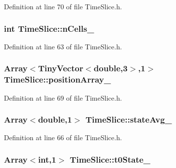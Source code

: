 \-Definition at line 70 of file \-Time\-Slice.\-h.

\hypertarget{class_time_slice_a8c39fe1d753d9af20ea7792cf727ca95}{
\subsubsection[{n\-Cells\-\_\-}]{\setlength{\rightskip}{0pt plus 5cm}int {\bf \-Time\-Slice\-::n\-Cells\-\_\-}}}\label{class_time_slice_a8c39fe1d753d9af20ea7792cf727ca95}


\-Definition at line 63 of file \-Time\-Slice.\-h.

\hypertarget{class_time_slice_a42601d72900c7a65b25fe383bedfb9c3}{
\subsubsection[{position\-Array\-\_\-}]{\setlength{\rightskip}{0pt plus 5cm}\-Array$<$\-Tiny\-Vector$<$double,3$>$,1$>$ {\bf \-Time\-Slice\-::position\-Array\-\_\-}}}\label{class_time_slice_a42601d72900c7a65b25fe383bedfb9c3}


\-Definition at line 69 of file \-Time\-Slice.\-h.

\hypertarget{class_time_slice_a493d0742a92ed123079680e6c8954ba4}{
\subsubsection[{state\-Avg\-\_\-}]{\setlength{\rightskip}{0pt plus 5cm}\-Array$<$double,1$>$ {\bf \-Time\-Slice\-::state\-Avg\-\_\-}}}\label{class_time_slice_a493d0742a92ed123079680e6c8954ba4}


\-Definition at line 66 of file \-Time\-Slice.\-h.

\hypertarget{class_time_slice_a7c34fff41b24089478a09572a8f0a926}{
\subsubsection[{t0\-State\-\_\-}]{\setlength{\rightskip}{0pt plus 5cm}\-Array$<$int,1$>$ {\bf \-Time\-Slice\-::t0\-State\-\_\-}}}\label{class_time_slice_a7c34fff41b24089478a09572a8f0a926}


